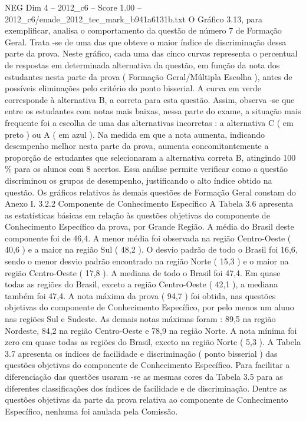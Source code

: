 \begin{textsample}{NEG Dim 4 – 2012\_c6 – Score 1.00 – 2012\_c6/enade\_2012\_tec\_mark\_b941a6131b.txt}
O Gráfico 3.13, para exemplificar, analisa o comportamento da questão de número 7 de Formação Geral.
Trata -se de uma das que obteve o maior índice de discriminação dessa parte da prova.
Neste gráfico, cada uma das cinco curvas representa o percentual de respostas em determinada alternativa da questão, em função da nota dos estudantes nesta parte da prova ( Formação Geral/Múltipla Escolha ), antes de possíveis eliminações pelo critério do ponto bisserial.
A curva em verde corresponde à alternativa B, a correta para esta questão.
Assim, observa -se que entre os estudantes com notas mais baixas, nessa parte do exame, a situação mais frequente foi a escolha de uma das alternativas incorretas : a alternativa C ( em preto ) ou A ( em azul ).
Na medida em que a nota aumenta, indicando desempenho melhor nesta parte da prova, aumenta concomitantemente a proporção de estudantes que selecionaram a alternativa correta B, atingindo 100 \% para os alunos com 8 acertos.
Essa análise permite verificar como a questão discriminou os grupos de desempenho, justificando o alto índice obtido na questão.
Os gráficos relativos às demais questões de Formação Geral constam do Anexo I. 3.2.2 Componente de Conhecimento Específico A Tabela 3.6 apresenta as estatísticas básicas em relação às questões objetivas do componente de Conhecimento Específico da prova, por Grande Região.
A média do Brasil deste componente foi de 46,4.
A menor média foi observada na região Centro-Oeste ( 40,6 ) e a maior na região Sul ( 48,2 ).
O desvio padrão de todo o Brasil foi 16,6, sendo o menor desvio padrão encontrado na região Norte ( 15,3 ) e o maior na região Centro-Oeste ( 17,8 ).
A mediana de todo o Brasil foi 47,4.
Em quase todas as regiões do Brasil, exceto a região Centro-Oeste ( 42,1 ), a mediana também foi 47,4.
A nota máxima da prova ( 94,7 ) foi obtida, nas questões objetivas do componente de Conhecimento Específico, por pelo menos um aluno nas regiões Sul e Sudeste.
As demais notas máximas foram : 89,5 na região Nordeste, 84,2 na região Centro-Oeste e 78,9 na região Norte.
A nota mínima foi zero em quase todas as regiões do Brasil, exceto na região Norte ( 5,3 ).
A Tabela 3.7 apresenta os índices de facilidade e discriminação ( ponto bisserial ) das questões objetivas do componente de Conhecimento Específico.
Para facilitar a diferenciação das questões usaram -se as mesmas cores da Tabela 3.5 para as diferentes classificações dos índices de facilidade e de discriminação.
Dentre as questões objetivas da parte da prova relativa ao componente de Conhecimento Específico, nenhuma foi anulada pela Comissão.

\end{textsample}
